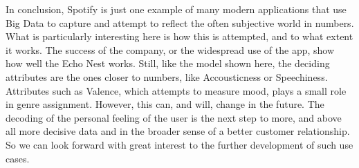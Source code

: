         In conclusion, Spotify is just one example of many modern applications that use Big Data to capture and attempt to reflect the often subjective world in numbers. 
        What is particularly interesting here is how this is attempted, and to what extent it works. The success of the company, or the widespread use of the app, 
        show how well the Echo Nest works. Still, like the model shown here, the deciding attributes are the ones closer to numbers, like Accousticness or Speechiness. 
        Attributes such as Valence, which attempts to measure mood, plays a small role in genre assignment. However, this can, and will, change in the future. 
        The decoding of the personal feeling of the user is the next step to more, and above all more decisive data and in the broader sense of a better customer relationship. 
        So we can look forward with great interest to the further development of such use cases.

